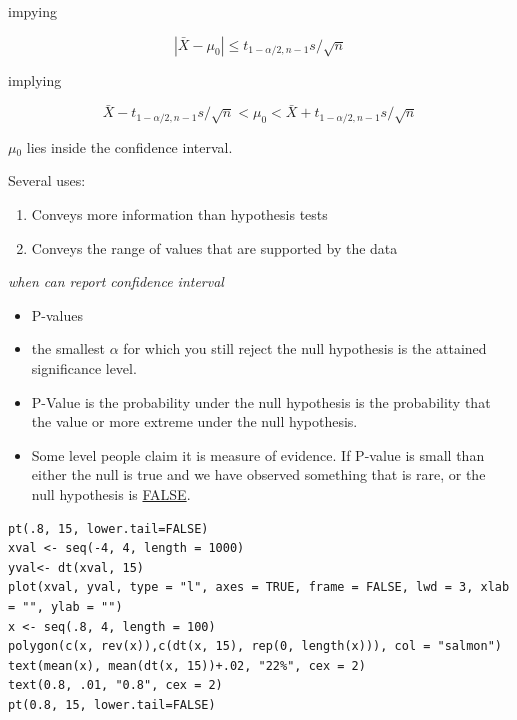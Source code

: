 \documentclass[11pt]{article}
\begin{document}
impying

$$  \left|\bar X - \mu_0 \right| \leq t_{1-\alpha/2, n-1} s /\sqrt{n} $$

implying

$$  \bar X - t_{1-\alpha/2, n-1} s /\sqrt{n} < \mu_0
< \bar X + t_{1-\alpha/2, n-1} s /\sqrt{n}  $$

$\mu$$_0$ lies inside the confidence interval.

Several uses:
\begin{enumerate}
\item Conveys more information than hypothesis tests
\item Conveys the range of values that are supported by the data
\end{enumerate}

\emph{when can report confidence interval}

\begin{itemize}
\item P-values
\item the smallest $\alpha$ for which you still reject the null hypothesis
  is the attained significance level.
\item P-Value is the probability under the null hypothesis is the
  probability that the value or more extreme under the null
  hypothesis.
\item Some level people claim it is measure of evidence. If P-value is
  small than either the null is true and we have observed something
  that is rare, or the null hypothesis is \underline{FALSE}.
\end{itemize}

   

\begin{verbatim}
pt(.8, 15, lower.tail=FALSE)
xval <- seq(-4, 4, length = 1000)
yval<- dt(xval, 15)
plot(xval, yval, type = "l", axes = TRUE, frame = FALSE, lwd = 3, xlab = "", ylab = "")
x <- seq(.8, 4, length = 100)
polygon(c(x, rev(x)),c(dt(x, 15), rep(0, length(x))), col = "salmon")
text(mean(x), mean(dt(x, 15))+.02, "22%", cex = 2)
text(0.8, .01, "0.8", cex = 2)
pt(0.8, 15, lower.tail=FALSE)
\end{verbatim}
\end{document}
